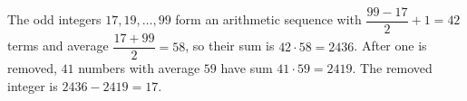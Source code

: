 The odd integers $17,19,\dots,99$ form an arithmetic sequence with $\dfrac{99-17}{2}+1=42$ terms and average $\dfrac{17+99}{2}=58$, so their sum is $42\cdot58=2436$. After one is removed, $41$ numbers with average $59$ have sum $41\cdot59=2419$. The removed integer is $2436-2419=\boxed{17}$.
